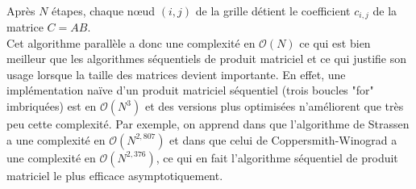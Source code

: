 \paragraph{} Après $N$ étapes, chaque nœud $(i,j)$ de la grille détient le coefficient $c_{i,j}$ de la matrice $C = AB$.\\


Cet algorithme parallèle a donc une complexité en $\mathcal{O}(N)$ ce qui est bien meilleur que les algorithmes séquentiels de produit matriciel et ce qui justifie son usage lorsque la taille des matrices devient importante. En effet, une implémentation naïve d'un produit matriciel séquentiel (trois boucles "for" imbriquées) est en $\mathcal{O}(N^3)$ et des versions plus optimisées n'améliorent que très peu cette complexité. Par exemple, on apprend dans \cite{wiki:Strassen} que l'algorithme de Strassen a une complexité en $\mathcal{O}(N^{2,807})$ et dans \cite{wiki:Coppersmith-Winograd} que celui de Coppersmith-Winograd a une complexité en $\mathcal{O}(N^{2,376})$, ce qui en fait l'algorithme séquentiel de produit matriciel le plus efficace asymptotiquement.
